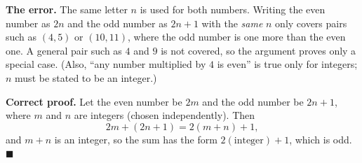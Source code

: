 \textbf{The error.} The same letter $n$ is used for both numbers. Writing the even number as $2n$ and the odd number as $2n+1$ with the \emph{same} $n$ only covers pairs such as $(4,5)$ or $(10,11)$, where the odd number is one more than the even one. A general pair such as $4$ and $9$ is not covered, so the argument proves only a special case. (Also, ``any number multiplied by $4$ is even'' is true only for integers; $n$ must be stated to be an integer.)

\textbf{Correct proof.} Let the even number be $2m$ and the odd number be $2n+1$, where $m$ and $n$ are integers (chosen independently). Then
\[
2m+(2n+1)=2(m+n)+1,
\]
and $m+n$ is an integer, so the sum has the form $2(\text{integer})+1$, which is odd. $\blacksquare$
